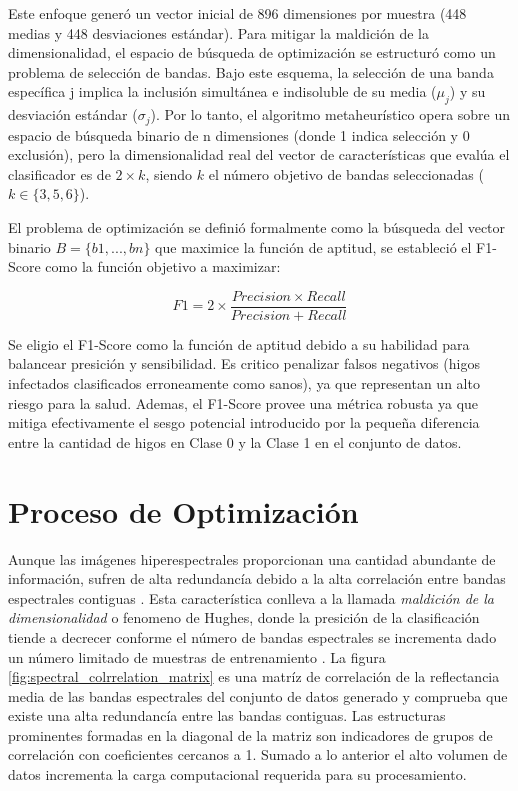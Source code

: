 Este enfoque generó un vector inicial de 896 dimensiones por muestra (448 medias y 448 desviaciones estándar). Para mitigar la maldición de la dimensionalidad, el espacio de búsqueda de optimización se estructuró como un problema de selección de bandas.
Bajo este esquema, la selección de una banda específica j implica la inclusión simultánea e indisoluble de su media ($\mu_j$) y su desviación estándar ($\sigma_j$).
Por lo tanto, el algoritmo metaheurístico opera sobre un espacio de búsqueda binario de n dimensiones (donde 1 indica selección y 0 exclusión), pero la dimensionalidad real del vector de características que evalúa el clasificador es de $ 2\times{k} $, siendo $k$ el número objetivo de bandas seleccionadas ($k\in\{3, 5, 6\}$).

El problema de optimización se definió formalmente como la búsqueda del vector binario $B=\{b1,...,bn\}$ que maximice la función de aptitud, se estableció el F1-Score como la función objetivo a maximizar:

\begin{equation}
    F1=2 \times{\frac{Precision\times{Recall}}{Precision+Recall}}
\end{equation}

Se eligio el F1-Score como la función de aptitud debido a su habilidad para balancear presición y sensibilidad. Es critico penalizar falsos negativos (higos infectados clasificados erroneamente como sanos), ya que representan un alto riesgo para la salud. Ademas, el F1-Score provee una métrica robusta ya que mitiga efectivamente el sesgo potencial introducido por la pequeña diferencia entre la cantidad de higos en Clase 0 y la Clase 1 en el conjunto de datos.

\section{Proceso de Optimización}
Aunque las imágenes hiperespectrales proporcionan una cantidad abundante de información, sufren de alta redundancía debido a la alta correlación entre bandas espectrales contiguas \cite{sawant_survey_2020}.
Esta característica conlleva a la llamada \textit{maldición de la dimensionalidad} o fenomeno de Hughes, donde la presición de la clasificación tiende a decrecer conforme el número de bandas espectrales se incrementa dado un número limitado de muestras de entrenamiento \cite{hughes_mean_1968}.
La figura \ref{fig:spectral_colrrelation_matrix} es una matríz de correlación de la reflectancia media de las bandas espectrales del conjunto de datos generado y comprueba que existe una alta redundancía entre las bandas contiguas.
Las estructuras prominentes formadas en la diagonal de la matriz son indicadores de grupos de correlación con coeficientes cercanos a 1. Sumado a lo anterior el alto volumen de datos incrementa la carga computacional requerida para su procesamiento. 

